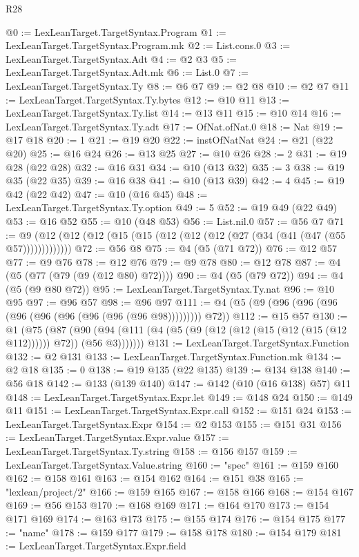 \begin{lexlean}{R28}
\begin{coremodule}
@0 := LexLeanTarget.TargetSyntax.Program
@1 := LexLeanTarget.TargetSyntax.Program.mk
@2 := List.cons.{0}
@3 := LexLeanTarget.TargetSyntax.Adt
@4 := @2 @3
@5 := LexLeanTarget.TargetSyntax.Adt.mk
@6 := List.{0}
@7 := LexLeanTarget.TargetSyntax.Ty
@8 := @6 @7
@9 := @2 @8
@10 := @2 @7
@11 := LexLeanTarget.TargetSyntax.Ty.bytes
@12 := @10 @11
@13 := LexLeanTarget.TargetSyntax.Ty.list
@14 := @13 @11
@15 := @10 @14
@16 := LexLeanTarget.TargetSyntax.Ty.adt
@17 := OfNat.ofNat.{0}
@18 := Nat
@19 := @17 @18
@20 := 1
@21 := @19 @20
@22 := instOfNatNat
@24 := @21 (@22 @20)
@25 := @16 @24
@26 := @13 @25
@27 := @10 @26
@28 := 2
@31 := @19 @28 (@22 @28)
@32 := @16 @31
@34 := @10 (@13 @32)
@35 := 3
@38 := @19 @35 (@22 @35)
@39 := @16 @38
@41 := @10 (@13 @39)
@42 := 4
@45 := @19 @42 (@22 @42)
@47 := @10 (@16 @45)
@48 := LexLeanTarget.TargetSyntax.Ty.option
@49 := 5
@52 := @19 @49 (@22 @49)
@53 := @16 @52
@55 := @10 (@48 @53)
@56 := List.nil.{0}
@57 := @56 @7
@71 := @9 (@12 (@12 (@12 (@15 (@15 (@12 (@12 (@12 (@27 (@34 (@41 (@47 (@55 @57)))))))))))))
@72 := @56 @8
@75 := @4 (@5 (@71 @72))
@76 := @12 @57
@77 := @9 @76
@78 := @12 @76
@79 := @9 @78
@80 := @12 @78
@87 := @4 (@5 (@77 (@79 (@9 (@12 @80) @72))))
@90 := @4 (@5 (@79 @72))
@94 := @4 (@5 (@9 @80 @72))
@95 := LexLeanTarget.TargetSyntax.Ty.nat
@96 := @10 @95
@97 := @96 @57
@98 := @96 @97
@111 := @4 (@5 (@9 (@96 (@96 (@96 (@96 (@96 (@96 (@96 (@96 (@96 @98))))))))) @72))
@112 := @15 @57
@130 := @1
    (@75
      (@87 (@90 (@94 (@111 (@4 (@5 (@9 (@12 (@12 (@15 (@12 (@15 (@12 @112)))))) @72)) (@56 @3)))))))
@131 := LexLeanTarget.TargetSyntax.Function
@132 := @2 @131
@133 := LexLeanTarget.TargetSyntax.Function.mk
@134 := @2 @18
@135 := 0
@138 := @19 @135 (@22 @135)
@139 := @134 @138
@140 := @56 @18
@142 := @133 (@139 @140)
@147 := @142 (@10 (@16 @138) @57) @11
@148 := LexLeanTarget.TargetSyntax.Expr.let
@149 := @148 @24
@150 := @149 @11
@151 := LexLeanTarget.TargetSyntax.Expr.call
@152 := @151 @24
@153 := LexLeanTarget.TargetSyntax.Expr
@154 := @2 @153
@155 := @151 @31
@156 := LexLeanTarget.TargetSyntax.Expr.value
@157 := LexLeanTarget.TargetSyntax.Ty.string
@158 := @156 @157
@159 := LexLeanTarget.TargetSyntax.Value.string
@160 := "spec"
@161 := @159 @160
@162 := @158 @161
@163 := @154 @162
@164 := @151 @38
@165 := "lexlean/project/2"
@166 := @159 @165
@167 := @158 @166
@168 := @154 @167
@169 := @56 @153
@170 := @168 @169
@171 := @164 @170
@173 := @154 @171 @169
@174 := @163 @173
@175 := @155 @174
@176 := @154 @175
@177 := "name"
@178 := @159 @177
@179 := @158 @178
@180 := @154 @179
@181 := LexLeanTarget.TargetSyntax.Expr.field

\end{coremodule}
\end{lexlean}

